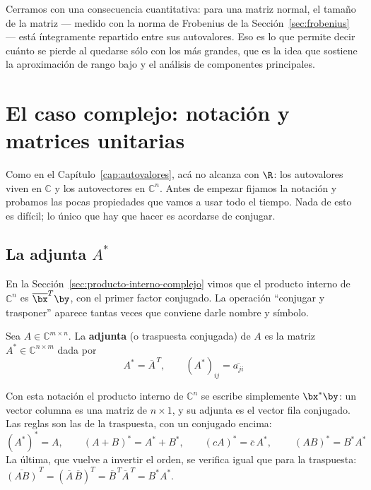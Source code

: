Cerramos con una consecuencia cuantitativa: para una matriz normal, el tamaño de la
matriz --- medido con la norma de Frobenius de la Sección~\ref{sec:frobenius} --- está
íntegramente repartido entre sus autovalores. Eso es lo que permite decir cuánto se
pierde al quedarse sólo con los más grandes, que es la idea que sostiene la aproximación
de rango bajo y el análisis de componentes principales.

\section{El caso complejo: notación y matrices unitarias}
\label{sec:notacion-compleja}

Como en el Capítulo~\ref{cap:autovalores}, acá no alcanza con $\R$: los autovalores
viven en $\mathbb{C}$ y los autovectores en $\mathbb{C}^n$. Antes de empezar fijamos la
notación y probamos las pocas propiedades que vamos a usar todo el tiempo. Nada de esto
es difícil; lo único que hay que hacer es acordarse de conjugar.

\subsection*{La adjunta \texorpdfstring{$A^{*}$}{A*}}

En la Sección~\ref{sec:producto-interno-complejo} vimos que el producto interno de
$\mathbb{C}^n$ es $\overline{\bx}^{T}\by$, con el primer factor conjugado. La operación
``conjugar y trasponer'' aparece tantas veces que conviene darle nombre y símbolo.

\begin{definicion}[Adjunta]\label{def:adjunta}
Sea $A\in\mathbb{C}^{m\times n}$. La \textbf{adjunta} (o traspuesta conjugada) de $A$ es
la matriz $A^{*}\in\mathbb{C}^{n\times m}$ dada por
\[
\boxed{\ A^{*}=\overline{A}^{\,T},\qquad (A^{*})_{ij}=\overline{a_{ji}}\ }
\]
\end{definicion}

Con esta notación el producto interno de $\mathbb{C}^n$ se escribe simplemente
$\bx^{*}\by$: un vector columna es una matriz de $n\times1$, y su adjunta es el vector
fila conjugado. Las reglas son las de la traspuesta, con un conjugado encima:
\[
(A^{*})^{*}=A,
\qquad
(A+B)^{*}=A^{*}+B^{*},
\qquad
(cA)^{*}=\overline{c}\,A^{*},
\qquad
\boxed{\ (AB)^{*}=B^{*}A^{*}\ }
\]
La última, que vuelve a invertir el orden, se verifica igual que para la traspuesta:
$\overline{(AB)}^{\,T}=(\overline{A}\,\overline{B})^{T}
=\overline{B}^{\,T}\overline{A}^{\,T}=B^{*}A^{*}$.

